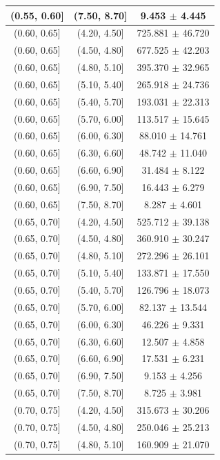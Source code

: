\begin{longtable}{|c|c|c|}
\hline
(0.55, 0.60] & (7.50, 8.70] & 9.453 $\pm$ 4.445 \\ 
\hline
(0.60, 0.65] & (4.20, 4.50] & 725.881 $\pm$ 46.720 \\ 
\hline
(0.60, 0.65] & (4.50, 4.80] & 677.525 $\pm$ 42.203 \\ 
\hline
(0.60, 0.65] & (4.80, 5.10] & 395.370 $\pm$ 32.965 \\ 
\hline
(0.60, 0.65] & (5.10, 5.40] & 265.918 $\pm$ 24.736 \\ 
\hline
(0.60, 0.65] & (5.40, 5.70] & 193.031 $\pm$ 22.313 \\ 
\hline
(0.60, 0.65] & (5.70, 6.00] & 113.517 $\pm$ 15.645 \\ 
\hline
(0.60, 0.65] & (6.00, 6.30] & 88.010 $\pm$ 14.761 \\ 
\hline
(0.60, 0.65] & (6.30, 6.60] & 48.742 $\pm$ 11.040 \\ 
\hline
(0.60, 0.65] & (6.60, 6.90] & 31.484 $\pm$ 8.122 \\ 
\hline
(0.60, 0.65] & (6.90, 7.50] & 16.443 $\pm$ 6.279 \\ 
\hline
(0.60, 0.65] & (7.50, 8.70] & 8.287 $\pm$ 4.601 \\ 
\hline
(0.65, 0.70] & (4.20, 4.50] & 525.712 $\pm$ 39.138 \\ 
\hline
(0.65, 0.70] & (4.50, 4.80] & 360.910 $\pm$ 30.247 \\ 
\hline
(0.65, 0.70] & (4.80, 5.10] & 272.296 $\pm$ 26.101 \\ 
\hline
(0.65, 0.70] & (5.10, 5.40] & 133.871 $\pm$ 17.550 \\ 
\hline
(0.65, 0.70] & (5.40, 5.70] & 126.796 $\pm$ 18.073 \\ 
\hline
(0.65, 0.70] & (5.70, 6.00] & 82.137 $\pm$ 13.544 \\ 
\hline
(0.65, 0.70] & (6.00, 6.30] & 46.226 $\pm$ 9.331 \\ 
\hline
(0.65, 0.70] & (6.30, 6.60] & 12.507 $\pm$ 4.858 \\ 
\hline
(0.65, 0.70] & (6.60, 6.90] & 17.531 $\pm$ 6.231 \\ 
\hline
(0.65, 0.70] & (6.90, 7.50] & 9.153 $\pm$ 4.256 \\ 
\hline
(0.65, 0.70] & (7.50, 8.70] & 8.725 $\pm$ 3.981 \\ 
\hline
(0.70, 0.75] & (4.20, 4.50] & 315.673 $\pm$ 30.206 \\ 
\hline
(0.70, 0.75] & (4.50, 4.80] & 250.046 $\pm$ 25.213 \\ 
\hline
(0.70, 0.75] & (4.80, 5.10] & 160.909 $\pm$ 21.070 \\ 

\end{longtable}
